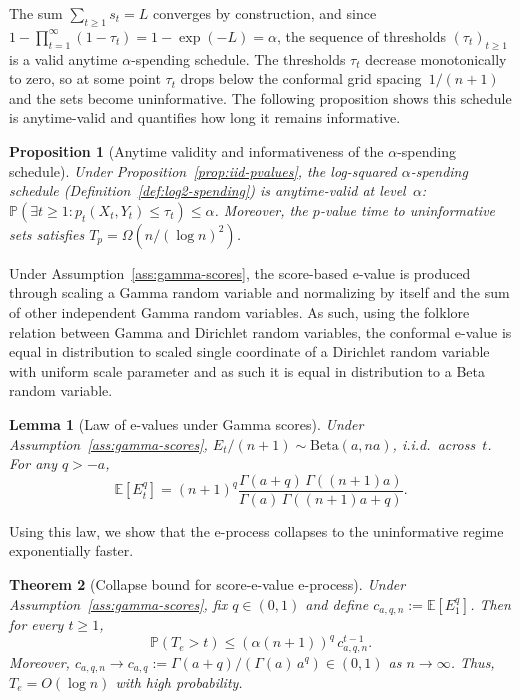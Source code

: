 \documentclass{uai2026} %
\newtheorem{theorem}{Theorem}[section]
\newtheorem{proposition}[theorem]{Proposition}
\newtheorem{lemma}{Lemma}
\newcommand{\1}{\mathbf{1}}
\newcommand{\prob}{\mathbb{P}}
\newcommand{\expec}{\mathbb{E}}
\begin{document}
The sum $\sum_{t \ge 1} s_t = L$ converges by construction, and since $1 - \prod_{t=1}^\infty (1-\tau_t) = 1 - \exp(-L) = \alpha$, the sequence of thresholds $(\tau_t)_{t \ge 1}$ is a valid anytime $\alpha$-spending schedule.
The thresholds $\tau_t$ decrease monotonically to zero, so at some point $\tau_t$ drops below the conformal grid spacing~$1/(n{+}1)$ and the sets become uninformative.
The following proposition shows this schedule is anytime-valid and quantifies how long it remains informative.

\begin{proposition}[Anytime validity and informativeness of the $\alpha$-spending schedule]
  \label{prop:log2-spending}
  Under Proposition~\ref{prop:iid-pvalues}, the log-squared $\alpha$-spending schedule (Definition~\ref{def:log2-spending}) is anytime-valid at level~$\alpha$: $\prob(\exists t \ge 1 : p_t(X_t, Y_t) \le \tau_t) \le \alpha$.
  Moreover, the $p$-value time to uninformative sets satisfies $T_p = \Omega(n / (\log n)^2)$.
\end{proposition}

Under Assumption~\ref{ass:gamma-scores}, the score-based e-value is produced through scaling a Gamma random variable and normalizing by itself and the sum of other independent Gamma random variables. As such, using the folklore relation between Gamma and Dirichlet random variables, the conformal e-value is equal in distribution to scaled single coordinate of a Dirichlet random variable with uniform scale parameter and as such it is equal in distribution to a Beta random variable.

\begin{lemma}[Law of e-values under Gamma scores]
  \label{lem:beta-law}
  Under Assumption~\ref{ass:gamma-scores},
  $E_t / (n{+}1) \sim \mathrm{Beta}(a, na)$, i.i.d.\ across~$t$.
  For any $q > -a$,
  \begin{equation}
    \label{eq:Eq-moment}
    \expec[E_t^q]
    = (n{+}1)^q \frac{\Gamma(a{+}q)\,\Gamma((n{+}1)a)}{\Gamma(a)\,\Gamma((n{+}1)a{+}q)}.
  \end{equation}
\end{lemma}

Using this law, we show that the e-process collapses to the uninformative regime exponentially faster.

\begin{theorem}[Collapse bound for score-e-value e-process]
  \label{thm:Tfull-bound}
  Under Assumption~\ref{ass:gamma-scores}, fix $q \in (0,1)$ and define $c_{a,q,n} := \expec[E_1^q]$.
  Then for every $t \ge 1$,
  \begin{equation}
    \label{eq:Tfull-tail}
    \prob(T_e > t) \le (\alpha(n{+}1))^q\, c_{a,q,n}^{t-1}.
  \end{equation}
  Moreover, $c_{a,q,n} \to c_{a,q} := \Gamma(a{+}q)/(\Gamma(a)\,a^q) \in (0,1)$ as $n \to \infty$.
  Thus, $T_e = O(\log n)$ with high probability.
\end{theorem}
\end{document}

